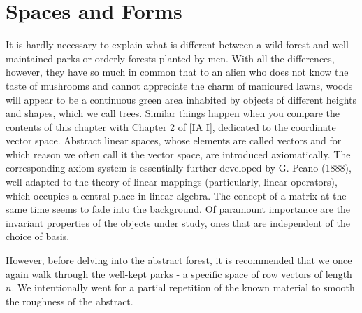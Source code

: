\chapter{Spaces and Forms}
It is hardly necessary to explain what is different between a wild forest and well maintained parks or orderly forests planted by men. With all the differences, however, they have so much in common that to an alien who does not know the taste of mushrooms and cannot appreciate the charm of manicured lawns, woods will appear to be a continuous green area inhabited by objects of different heights and shapes, which we call trees. Similar things happen when you compare the contents of this chapter with Chapter 2 of [IA I], dedicated to the coordinate vector space. Abstract linear spaces, whose elements are called vectors and for which reason we often call it the vector space, are introduced axiomatically. The corresponding axiom system is essentially further developed by G. Peano (1888), well adapted to the theory of linear mappings (particularly, linear operators), which occupies a central place in linear algebra. The concept of a matrix at the same time seems to fade into the background. Of paramount importance are the invariant properties of the objects under study, ones that are independent of the choice of basis. 

However, before delving into the abstract forest, it is recommended that we once again walk through the well-kept parks - a specific space of row vectors of length $n$. We intentionally went for a partial repetition of the known material to smooth the roughness of the abstract.



